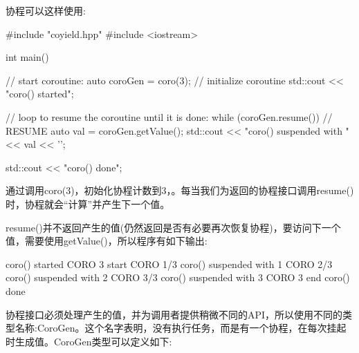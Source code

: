 协程可以这样使用:


\begin{cpp}
#include "coyield.hpp"
#include <iostream>

int main()
{
	// start coroutine:
	auto coroGen = coro(3); // initialize coroutine
	std::cout << "coro() started\n";

	// loop to resume the coroutine until it is done:
	while (coroGen.resume()) { // RESUME
		auto val = coroGen.getValue();
		std::cout << "coro() suspended with " << val << '\n';
	}

	std::cout << "coro() done\n";
}
\end{cpp}

通过调用coro(3)，初始化协程计数到3，。每当我们为返回的协程接口调用resume()时，协程就会“计算”并产生下一个值。

resume()并不返回产生的值(仍然返回是否有必要再次恢复协程)，要访问下一个值，需要使用getValue()，所以程序有如下输出:

\begin{shell}
coro() started
         CORO 3 start
         CORO 1/3
coro() suspended with 1
         CORO 2/3
coro() suspended with 2
         CORO 3/3
coro() suspended with 3
         CORO 3 end
coro() done
\end{shell}

协程接口必须处理产生的值，并为调用者提供稍微不同的API，所以使用不同的类型名称:CoroGen。这个名字表明，没有执行任务，而是有一个协程，在每次挂起时生成值。CoroGen类型可以定义如下:


